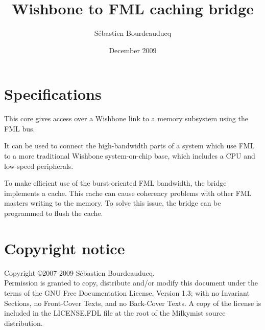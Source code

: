 \documentclass[a4paper,11pt]{article}
\title{Wishbone to FML caching bridge}
\author{S\'ebastien Bourdeauducq}
\date{December 2009}
\begin{document}
\setlength{\parindent}{0pt}
\setlength{\parskip}{5pt}
\maketitle{}
\section{Specifications}
This core gives access over a Wishbone link to a memory subsystem using the FML bus.

It can be used to connect the high-bandwidth parts of a system which use FML to a more traditional Wishbone system-on-chip base, which includes a CPU and low-speed peripherals.

To make efficient use of the burst-oriented FML bandwidth, the bridge implements a cache. This cache can cause coherency problems with other FML masters writing to the memory. To solve this issue, the bridge can be programmed to flush the cache.

\section*{Copyright notice}
Copyright \copyright 2007-2009 S\'ebastien Bourdeauducq. \\
Permission is granted to copy, distribute and/or modify this document under the terms of the GNU Free Documentation License, Version 1.3; with no Invariant Sections, no Front-Cover Texts, and no Back-Cover Texts. A copy of the license is included in the LICENSE.FDL file at the root of the Milkymist source distribution.
\end{document}
